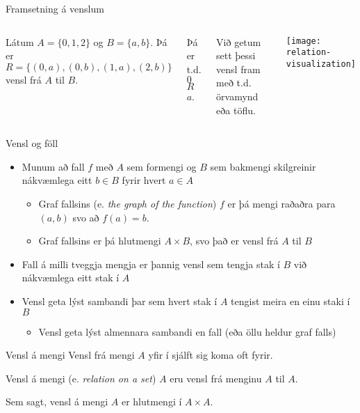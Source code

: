 \documentclass[handout]{beamer}
\begin{document}
\begin{frame}{Framsetning á venslum}
\begin{columns}
Látum $A = \{0, 1, 2\}$ og $B = \{a, b\}$. Þá er $R = \{(0,a), (0,b), (1,a), (2,b)\}$ vensl frá $A$ til $B$. 

Þá er t.d. $0$ $R$ $a$.

Við getum sett þessi vensl fram með t.d. örvamynd eða töflu.
\begin{center}
\texttt{[image: relation-visualization]}
\end{center}
\end{columns}
\end{frame}

\begin{frame}{Vensl og föll}
\begin{itemize}
 \item Munum að fall $f$ með $A$ sem formengi og $B$ sem bakmengi skilgreinir nákvæmlega eitt $b \in B$ fyrir hvert $a \in A$
 \begin{itemize}
  \item Graf fallsins (e. \emph{the graph of the function}) $f$ er þá mengi raðaðra para $(a, b)$ svo að $f(a) = b$.
  \item Graf fallsins er þá hlutmengi $A\times B$, svo það er vensl frá $A$ til $B$
 \end{itemize}
 \item Fall á milli tveggja mengja er þannig vensl sem tengja stak í $B$ við nákvæmlega eitt stak í $A$
 \item Vensl geta lýst sambandi þar sem hvert stak í $A$ tengist meira en einu staki í $B$
 \begin{itemize}
  \item Vensl geta lýst almennara sambandi en fall (eða öllu heldur graf falls)
\end{itemize}
\end{itemize}
\end{frame}

\begin{frame}{Vensl á mengi}
Vensl frá mengi $A$ yfir í sjálft sig koma oft fyrir.

\begin{tcolorbox}[title=Vensl á mengi]
Vensl á mengi (e. \emph{relation on a set}) $A$ eru vensl frá menginu $A$ til $A$. 
\end{tcolorbox}

Sem sagt, vensl á mengi $A$ er hlutmengi í $A \times A$.
\end{frame}
\end{document}
